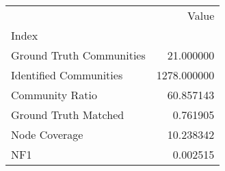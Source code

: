 \begin{tabular}{lr}
\toprule
{} &        Value \\
Index                    &              \\
\midrule
Ground Truth Communities &    21.000000 \\
Identified Communities   &  1278.000000 \\
Community Ratio          &    60.857143 \\
Ground Truth Matched     &     0.761905 \\
Node Coverage            &    10.238342 \\
NF1                      &     0.002515 \\
\bottomrule
\end{tabular}
